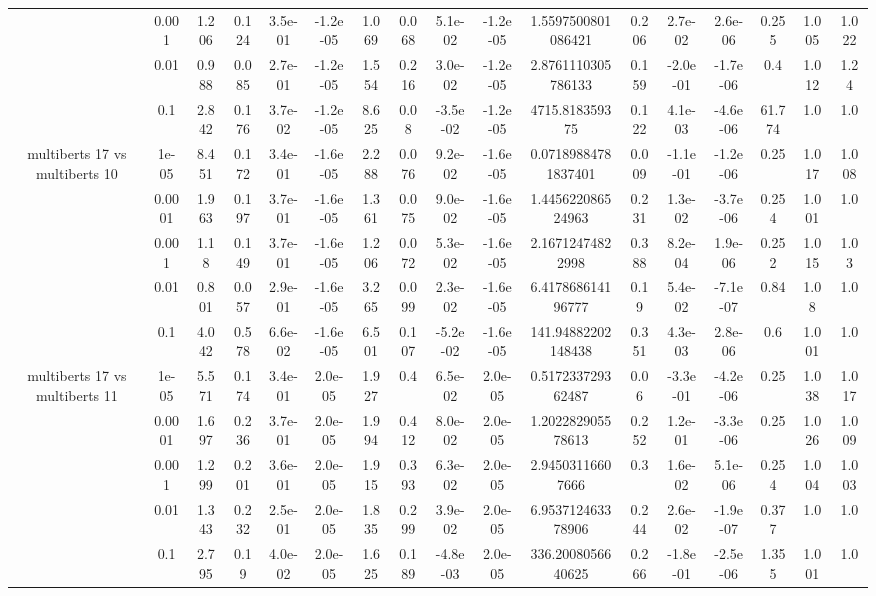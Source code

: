 \begin{tabular}{|c|c|c|c|c|c|c|c|c|c|c|c|c|c|c|c|c|}
 & 0.001 & 1.206 & 0.124 & 3.5e-01 & -1.2e-05 & 1.069 & 0.068 & 5.1e-02 & -1.2e-05 & 1.5597500801086421 & 0.206 & 2.7e-02 & 2.6e-06 & 0.255 & 1.005 & 1.022 \\
 & 0.01 & 0.988 & 0.085 & 2.7e-01 & -1.2e-05 & 1.554 & 0.216 & 3.0e-02 & -1.2e-05 & 2.8761110305786133 & 0.159 & -2.0e-01 & -1.7e-06 & 0.4 & 1.012 & 1.24 \\
 & 0.1 & 2.842 & 0.176 & 3.7e-02 & -1.2e-05 & 8.625 & 0.08 & -3.5e-02 & -1.2e-05 & 4715.818359375 & 0.122 & 4.1e-03 & -4.6e-06 & 61.774 & 1.0 & 1.0 \\
\hline
\multirow{5}{*}{multiberts 17 vs multiberts 10} & 1e-05 & 8.451 & 0.172 & 3.4e-01 & -1.6e-05 & 2.288 & 0.076 & 9.2e-02 & -1.6e-05 & 0.07189884781837401 & 0.009 & -1.1e-01 & -1.2e-06 & 0.25 & 1.017 & 1.008 \\
 & 0.0001 & 1.963 & 0.197 & 3.7e-01 & -1.6e-05 & 1.361 & 0.075 & 9.0e-02 & -1.6e-05 & 1.445622086524963 & 0.231 & 1.3e-02 & -3.7e-06 & 0.254 & 1.001 & 1.0 \\
 & 0.001 & 1.18 & 0.149 & 3.7e-01 & -1.6e-05 & 1.206 & 0.072 & 5.3e-02 & -1.6e-05 & 2.16712474822998 & 0.388 & 8.2e-04 & 1.9e-06 & 0.252 & 1.015 & 1.03 \\
 & 0.01 & 0.801 & 0.057 & 2.9e-01 & -1.6e-05 & 3.265 & 0.099 & 2.3e-02 & -1.6e-05 & 6.417868614196777 & 0.19 & 5.4e-02 & -7.1e-07 & 0.84 & 1.08 & 1.0 \\
 & 0.1 & 4.042 & 0.578 & 6.6e-02 & -1.6e-05 & 6.501 & 0.107 & -5.2e-02 & -1.6e-05 & 141.94882202148438 & 0.351 & 4.3e-03 & 2.8e-06 & 0.6 & 1.001 & 1.0 \\
\hline
\multirow{5}{*}{multiberts 17 vs multiberts 11} & 1e-05 & 5.571 & 0.174 & 3.4e-01 & 2.0e-05 & 1.927 & 0.4 & 6.5e-02 & 2.0e-05 & 0.517233729362487 & 0.06 & -3.3e-01 & -4.2e-06 & 0.25 & 1.038 & 1.017 \\
 & 0.0001 & 1.697 & 0.236 & 3.7e-01 & 2.0e-05 & 1.994 & 0.412 & 8.0e-02 & 2.0e-05 & 1.202282905578613 & 0.252 & 1.2e-01 & -3.3e-06 & 0.25 & 1.026 & 1.009 \\
 & 0.001 & 1.299 & 0.201 & 3.6e-01 & 2.0e-05 & 1.915 & 0.393 & 6.3e-02 & 2.0e-05 & 2.94503116607666 & 0.3 & 1.6e-02 & 5.1e-06 & 0.254 & 1.004 & 1.003 \\
 & 0.01 & 1.343 & 0.232 & 2.5e-01 & 2.0e-05 & 1.835 & 0.299 & 3.9e-02 & 2.0e-05 & 6.953712463378906 & 0.244 & 2.6e-02 & -1.9e-07 & 0.377 & 1.0 & 1.0 \\
 & 0.1 & 2.795 & 0.19 & 4.0e-02 & 2.0e-05 & 1.625 & 0.189 & -4.8e-03 & 2.0e-05 & 336.2008056640625 & 0.266 & -1.8e-01 & -2.5e-06 & 1.355 & 1.001 & 1.0 \\

\end{tabular}
